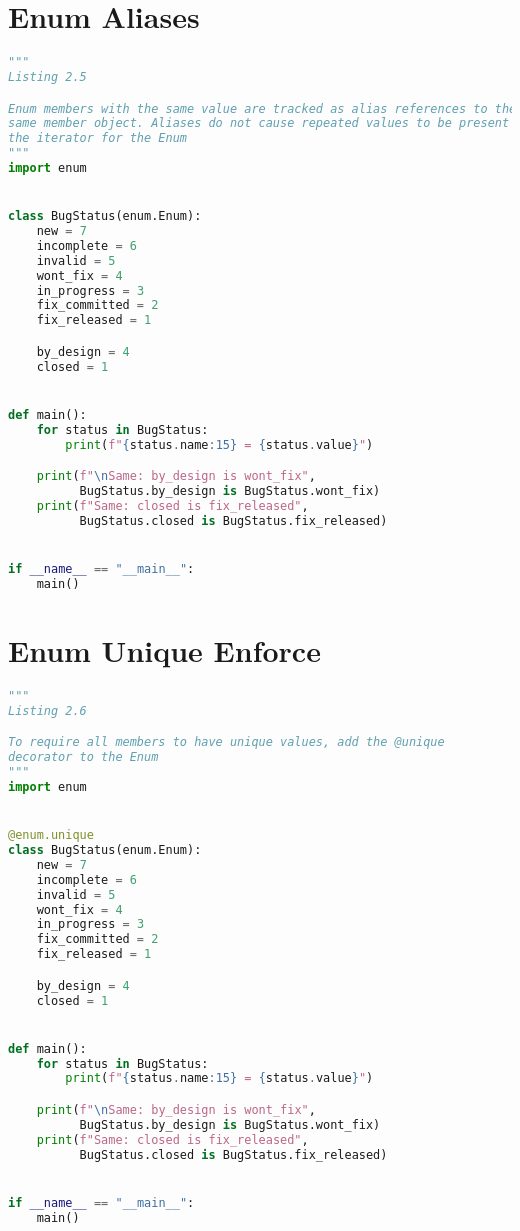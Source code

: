 \documentclass[a4paper,landscape]{report}
\begin{document}
\section{Enum Aliases}
\begin{lstlisting}[language=Python]
"""
Listing 2.5

Enum members with the same value are tracked as alias references to the
same member object. Aliases do not cause repeated values to be present in
the iterator for the Enum
"""
import enum


class BugStatus(enum.Enum):
    new = 7
    incomplete = 6
    invalid = 5
    wont_fix = 4
    in_progress = 3
    fix_committed = 2
    fix_released = 1

    by_design = 4
    closed = 1


def main():
    for status in BugStatus:
        print(f"{status.name:15} = {status.value}")

    print(f"\nSame: by_design is wont_fix",
          BugStatus.by_design is BugStatus.wont_fix)
    print(f"Same: closed is fix_released",
          BugStatus.closed is BugStatus.fix_released)


if __name__ == "__main__":
    main()

\end{lstlisting}
\section{Enum Unique Enforce}
\begin{lstlisting}[language=Python]
"""
Listing 2.6

To require all members to have unique values, add the @unique
decorator to the Enum
"""
import enum


@enum.unique
class BugStatus(enum.Enum):
    new = 7
    incomplete = 6
    invalid = 5
    wont_fix = 4
    in_progress = 3
    fix_committed = 2
    fix_released = 1

    by_design = 4
    closed = 1


def main():
    for status in BugStatus:
        print(f"{status.name:15} = {status.value}")

    print(f"\nSame: by_design is wont_fix",
          BugStatus.by_design is BugStatus.wont_fix)
    print(f"Same: closed is fix_released",
          BugStatus.closed is BugStatus.fix_released)


if __name__ == "__main__":
    main()

\end{lstlisting}
\end{document}
